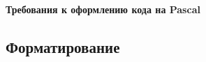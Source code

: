 \documentclass[11pt,a4paper,oneside]{article}
\begin{document}
\renewcommand{\t}[1]{\mbox{\texttt{#1}}}
\newcommand{\s}[1]{\mbox{``\t{#1}''}}
\newcommand{\eps}{\varepsilon}
\renewcommand{\phi}{\varphi}
\newcommand{\plainhat}{{\char 94}}

\newcommand{\Z}{\mathbb{Z}}
\newcommand{\w}[1]{``\t{#1}''}




\begin{LARGE} \textbf{Требования к оформлению кода на Pascal} \end{LARGE}
\newline
\subsection*{Форматирование}
\end{document}
